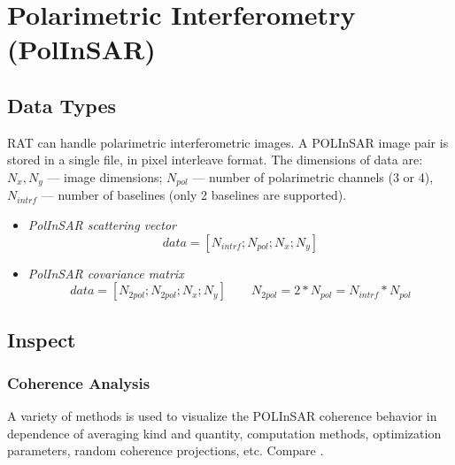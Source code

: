 \chapter{Polarimetric Interferometry (PolInSAR)}

\section{Data Types}

RAT can handle polarimetric interferometric images. A POLInSAR image
pair is stored in a single file, in pixel interleave format.
The dimensions of data are: $N_x,N_y$ --- image dimensions; $N_{pol}$ --- number of
polarimetric channels (3 or 4), $N_{intrf}$ --- number of baselines (only 2
baselines are supported).

\begin{itemize}
  \item \emph{PolInSAR scattering vector}
    \[data = [ N_{intrf}; N_{pol}; N_x; N_y ]\]
  \item \emph{PolInSAR covariance matrix}
    \[data = [ N_{2pol}; N_{2pol}; N_x; N_y ]\qquad N_{2pol}=2*N_{pol}=N_{intrf}*N_{pol}\]
\end{itemize}


\section{Inspect}

\subsection{Coherence Analysis}
A variety of methods is used to visualize the POLInSAR coherence behavior in
dependence of averaging kind and quantity, computation methods, optimization
parameters, random coherence projections, etc. Compare \cite{cloude03:inversion,
colin03:cohopt, flynn02:cohshape, guillaso05:esprit, yamada01:esprit}.

